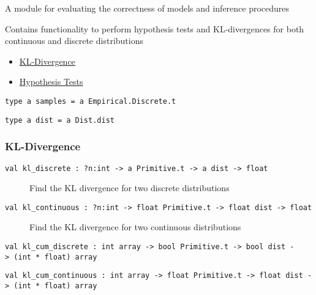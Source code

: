 A module for evaluating the correctness of models and inference
procedures

Contains functionality to perform hypothesis tests and KL-divergences
for both continuous and discrete distributions

\begin{itemize}
\tightlist
\item
  \protect\hyperlink{kl}{KL-Divergence}
\item
  \protect\hyperlink{hypux5ftests}{Hypothesis Tests}
\end{itemize}

\protect\hyperlink{type-samples}{}\texttt{type\ \textquotesingle{}a\ samples}\texttt{\ =\ \textquotesingle{}a\ Empirical.Discrete.t}

\protect\hyperlink{type-dist}{}\texttt{type\ \textquotesingle{}a\ dist}\texttt{\ =\ \textquotesingle{}a\ Dist.dist}

\hypertarget{kl}{\subsubsection{\texorpdfstring{\protect\hyperlink{kl}{}KL-Divergence}{KL-Divergence}}\label{kl}}

\begin{description}
\item[{\protect\hyperlink{val-klux5fdiscrete}{}\texttt{val\ kl\_discrete\ :\ ?⁠n:int\ -\textgreater{}\ \textquotesingle{}a\ Primitive.t\ -\textgreater{}\ \textquotesingle{}a\ dist\ -\textgreater{}\ float}}]
Find the KL divergence for two discrete distributions
\end{description}

\begin{description}
\item[{\protect\hyperlink{val-klux5fcontinuous}{}\texttt{val\ kl\_continuous\ :\ ?⁠n:int\ -\textgreater{}\ float\ Primitive.t\ -\textgreater{}\ float\ dist\ -\textgreater{}\ float}}]
Find the KL divergence for two continuous distributions
\end{description}

\protect\hyperlink{val-klux5fcumux5fdiscrete}{}\texttt{val\ kl\_cum\_discrete\ :\ int\ array\ -\textgreater{}\ bool\ Primitive.t\ -\textgreater{}\ bool\ dist\ -\textgreater{}\ (int\ *\ float)\ array}

\protect\hyperlink{val-klux5fcumux5fcontinuous}{}\texttt{val\ kl\_cum\_continuous\ :\ int\ array\ -\textgreater{}\ float\ Primitive.t\ -\textgreater{}\ float\ dist\ -\textgreater{}\ (int\ *\ float)\ array}

